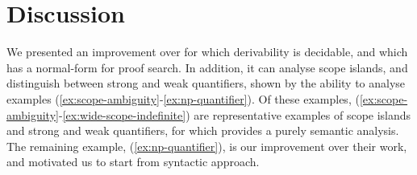 \documentclass[10pt,a4paper]{llncs}
\begin{document}
\section{Discussion}
We presented an improvement over  {\NLCL} for which
derivability is decidable, and which has a normal-form for proof
search. In addition, it can analyse scope islands, and distinguish
between strong and weak quantifiers, shown by the ability to analyse
examples (\ref{ex:scope-ambiguity}-\ref{ex:np-quantifier}).
Of these examples, (\ref{ex:scope-ambiguity}-\ref{ex:wide-scope-indefinite})
are representative examples of scope islands and strong and weak
quantifiers, for which \citet{kiselyov2014} provides a purely semantic
analysis. The remaining example, (\ref{ex:np-quantifier}), is our
improvement over their work, and motivated us to start from
 syntactic approach.



\end{document}
